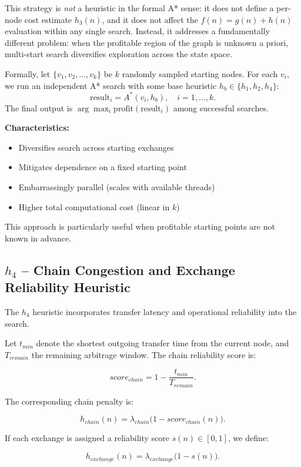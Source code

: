 This strategy is \emph{not} a heuristic in the formal A* sense: it does not define a per-node cost estimate $h_3(n)$, and it does not affect the $f(n) = g(n) + h(n)$ evaluation within any single search. Instead, it addresses a fundamentally different problem: when the profitable region of the graph is unknown a priori, multi-start search diversifies exploration across the state space.

Formally, let $\{v_1, v_2, \dots, v_k\}$ be $k$ randomly sampled starting nodes. For each $v_i$, we run an independent A* search with some base heuristic $h_b \in \{h_1, h_2, h_4\}$:
\[
\text{result}_i = A^*(v_i, h_b), \quad i = 1, \dots, k.
\]
The final output is $\arg\max_{i} \text{profit}(\text{result}_i)$ among successful searches.

\textbf{Characteristics:}
\begin{itemize}
    \item Diversifies search across starting exchanges
    \item Mitigates dependence on a fixed starting point
    \item Embarrassingly parallel (scales with available threads)
    \item Higher total computational cost (linear in $k$)
\end{itemize}

This approach is particularly useful when profitable starting points are not known in advance.

\subsection{$h_4$ -- Chain Congestion and Exchange Reliability Heuristic}

The $h_4$ heuristic incorporates transfer latency and operational reliability into the search.

Let $t_{min}$ denote the shortest outgoing transfer time from the current node, and $T_{remain}$ the remaining arbitrage window. The chain reliability score is:

\[
\textit{score}_{chain} =
1 - \frac{t_{min}}{T_{remain}}.
\]

The corresponding chain penalty is:

\[
h_{chain}(n) =
\lambda_{chain} \big(1 - \textit{score}_{chain}(n)\big).
\]

If each exchange is assigned a reliability score $s(n) \in [0,1]$, we define:

\[
h_{exchange}(n) =
\lambda_{exchange} \big(1 - s(n)\big).
\]

